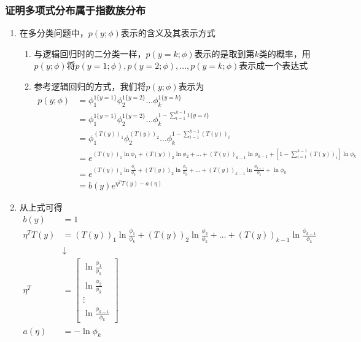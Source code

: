 \subsubsection{证明多项式分布属于指数族分布}
\begin{enumerate}
	\item 在多分类问题中，$p(y;\phi)$表示的含义及其表示方式
	\begin{enumerate}
		\item 与逻辑回归时的二分类一样，$p(y=k;\phi)$表示的是取到第$k$类的概率，用$p(y;\phi)$将$p(y=1;\phi), p(y=2;\phi), \dots, p(y=k;\phi)$表示成一个表达式
		\item 参考逻辑回归的方式，我们将$p(y;\phi)$表示为
		\begin{align}
			p(y;\phi) &= \phi_{1}^{1\{y=1\}}\phi_{2}^{1\{y=2\}}\dots\phi_{k}^{1\{y=k\}} \\
			&= \phi_{1}^{1\{y=1\}}\phi_{2}^{1\{y=2\}}\dots\phi_{k}^{1-\sum_{i=1}^{k-1}1\{y=i\}} \\
			&= \phi_{1}^{\left(T(y)\right)_1}\phi_{2}^{\left(T(y)\right)_2}\dots\phi_{k}^{1-\sum_{i=1}^{k-1}\left(T(y)\right)_i} \\
			&= e^{\left(T(y)\right)_1\ln\phi_1 + \left(T(y)\right)_2\ln\phi_2 + \dots + \left(T(y)\right)_{k-1}\ln\phi_{k-1} + \left[1-\sum_{i=1}^{k-1}\left(T(y)\right)_i\right]\ln\phi_k } \\
			&= e^{\left(T(y)\right)_1\ln\frac{\phi_1}{\phi_k} + \left(T(y)\right)_2\ln\frac{\phi_2}{\phi_k} + \dots + \left(T(y)\right)_{k-1}\ln\frac{\phi_{k-1}}{\phi_k} + \ln\phi_k} \\
			&= b(y)e^{\eta^T T(y) - a(\eta)}
		\end{align}
		\end{enumerate}
	\item 从上式可得
	\begin{align}
		b(y) &= 1 \\
		\eta^TT(y) &= \left(T(y)\right)_1\ln\frac{\phi_1}{\phi_k} + \left(T(y)\right)_2\ln\frac{\phi_2}{\phi_k} + \dots + \left(T(y)\right)_{k-1}\ln\frac{\phi_{k-1}}{\phi_k} \\
		&\downarrow \\
		\eta^T &= \left[\begin{matrix}
		\ln\frac{\phi_1}{\phi_k} \\ \ln\frac{\phi_2}{\phi_k} \\ \vdots \\ \ln\frac{\phi_{k-1}}{\phi_k}
		\end{matrix}\right] \\
		a(\eta) &= -\ln\phi_k
	\end{align}
\end{enumerate}


